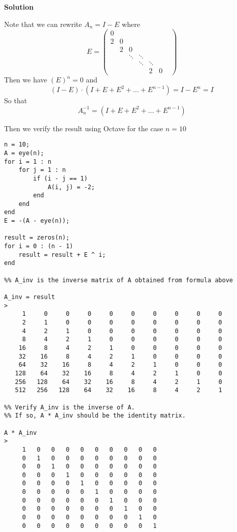 \documentclass[12pt,oneside,a4paper]{article}
\newcommand{\solution}
{
    \vspace{15pt}
    \noindent\ignorespaces\textbf{\large Solution}\par
}
\begin{document}
\solution
Note that we can rewrite $A_{n} = I - E$ where 
$$E = \begin{pmatrix}
0 &  & & & & &\\
2& 0& & & & &\\
  &  2& 0&  & & &\\
  & &\ddots&\ddots& & &\\
  &  & & \ddots & \ddots & &\\
    & &  & & 2 & 0
\end{pmatrix}$$
Then we have $(E)^n = 0$ and 
$$(I - E)\cdot(I + E + E^2 + \dots + E^{n-1}) = I - E^{n} = I$$
So that 
$$A_{n}^{-1} = (I + E + E^2 + \dots + E^{n-1})$$

Then we verify the result using Octave for the case $n = 10$
\begin{verbatim}
n = 10;
A = eye(n);
for i = 1 : n
    for j = 1 : n
        if (i - j == 1)
            A(i, j) = -2;
        end
    end
end
E = -(A - eye(n));

result = zeros(n);
for i = 0 : (n - 1)
    result = result + E ^ i;
end

%% A_inv is the inverse matrix of A obtained from formula above

A_inv = result
>
     1     0     0     0     0     0     0     0     0     0
     2     1     0     0     0     0     0     0     0     0
     4     2     1     0     0     0     0     0     0     0
     8     4     2     1     0     0     0     0     0     0
    16     8     4     2     1     0     0     0     0     0
    32    16     8     4     2     1     0     0     0     0
    64    32    16     8     4     2     1     0     0     0
   128    64    32    16     8     4     2     1     0     0
   256   128    64    32    16     8     4     2     1     0
   512   256   128    64    32    16     8     4     2     1

%% Verify A_inv is the inverse of A. 
%% If so, A * A_inv should be the identity matrix.

A * A_inv
>
     1   0   0   0   0   0   0   0   0   0
     0   1   0   0   0   0   0   0   0   0
     0   0   1   0   0   0   0   0   0   0
     0   0   0   1   0   0   0   0   0   0
     0   0   0   0   1   0   0   0   0   0
     0   0   0   0   0   1   0   0   0   0
     0   0   0   0   0   0   1   0   0   0
     0   0   0   0   0   0   0   1   0   0
     0   0   0   0   0   0   0   0   1   0
     0   0   0   0   0   0   0   0   0   1
\end{verbatim}
\end{document}
